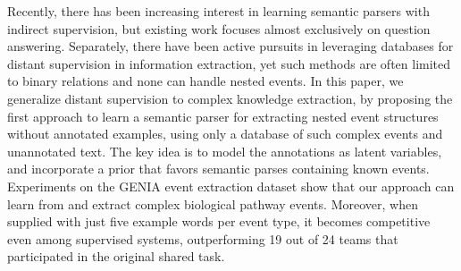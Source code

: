 Recently, there has been increasing interest in learning semantic parsers with indirect supervision, but existing work focuses almost exclusively on question answering. Separately, there have been active pursuits in leveraging databases for distant supervision in information extraction, yet such methods are often limited to binary relations and none can handle nested events. In this paper, we generalize distant supervision to complex knowledge extraction, by proposing the first approach to learn a semantic parser for extracting nested event structures without annotated examples, using only a database of such complex events and unannotated text. The key idea is to model the annotations as latent variables, and incorporate a prior that favors semantic parses containing known events. Experiments on the GENIA event extraction dataset show that our approach can learn from and extract complex biological pathway events. Moreover, when supplied with just five example words per event type, it becomes competitive even among supervised systems, outperforming 19 out of 24 teams that participated in the original shared task.
